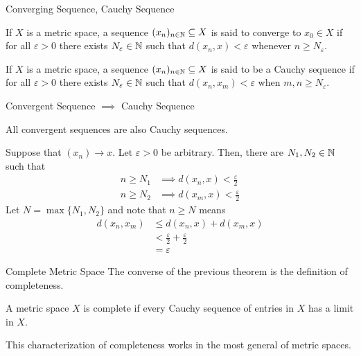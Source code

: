 \documentclass[10pt]{beamer}
\begin{document}
    \begin{frame}{Converging Sequence, Cauchy Sequence}
        \begin{definition}
            If $X$ is a metric space, a sequence $(x_n)_{n\in\mathbb{N}} \subseteq X$ is said to \alert{converge} to $x_0\in X$ if for all $\varepsilon > 0$ there exists $N_{\varepsilon} \in \mathbb{N}$ such that $d(x_n, x) < \varepsilon$ whenever $n\geq N_{\varepsilon}$. 
        \end{definition}

        \begin{definition}
            If $X$ is a metric space, a sequence $(x_n)_{n\in\mathbb{N}} \subseteq X$ is said to be a \alert{Cauchy sequence} if for all $\varepsilon > 0$ there exists $N_{\varepsilon} \in \mathbb{N}$ such that $d(x_n, x_m) < \varepsilon$ when $m, n \geq N_{\varepsilon}$. 
        \end{definition}
    \end{frame}

    \begin{frame}{Convergent Sequence $\implies$ Cauchy Sequence}
        \begin{theorem}
            All convergent sequences are also Cauchy sequences.
        \end{theorem}
        \begin{myproof}
            Suppose that $(x_n)\to x$. Let $\varepsilon > 0$ be arbitrary. Then, there are $N_1, N_2\in\mathbb{N}$ such that 
            \begin{align*}
                n\geq N_1 &\implies d(x_n, x) < \frac{\varepsilon}{2} \\ 
                n\geq N_2 &\implies d(x_m, x) < \frac{\varepsilon}{2}
            \end{align*}
            Let $N = \max\{N_1, N_2\}$ and note that $n\geq N$ means 
            \begin{align*}
                d(x_n, x_m) &\leq d(x_n, x) + d(x_m, x) \\ 
                &< \frac{\varepsilon}{2} + \frac{\varepsilon}{2} \\ 
                &= \varepsilon
            \end{align*}
        \end{myproof}
    \end{frame}

    \begin{frame}{Complete Metric Space}
        The converse of the previous theorem is the definition of completeness. 
        \begin{definition}
            A metric space $X$ is \alert{complete} if every Cauchy sequence of entries in $X$ has a limit in $X$. 
        \end{definition}
				This characterization of completeness works in the most general of metric spaces.
    \end{frame}
\end{document}
